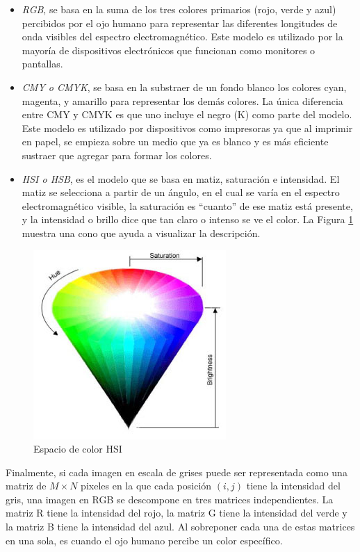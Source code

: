 \begin{itemize}

	\item \emph{RGB}, se basa en la suma de los tres colores primarios (rojo, verde y azul) percibidos por el ojo humano para representar las diferentes longitudes de onda visibles del espectro electromagnético. Este modelo es utilizado por la mayoría de dispositivos electrónicos que funcionan como monitores o pantallas.
	
	\item \emph{CMY o CMYK}, se basa en la substraer de un fondo blanco los colores cyan, magenta, y amarillo para representar los demás colores. La única diferencia entre CMY y CMYK es que uno incluye el negro (K) como parte del modelo. Este modelo es utilizado por dispositivos como impresoras ya que al imprimir en papel, se empieza sobre un medio que ya es blanco y es más eficiente sustraer que agregar para formar los colores.
	
	\item \emph{HSI o HSB}, es el modelo que se basa en matiz, saturación e intensidad. El matiz se selecciona a partir de un ángulo, en el cual se varía en el espectro electromagnético visible, la saturación es ``cuanto'' de ese matiz está presente, y la intensidad o brillo dice que tan claro o intenso se ve el color. La Figura \ref{fig:hsb} muestra una cono que ayuda a visualizar la descripción.	
	
\end{itemize}

\begin{figure}
	\includegraphics[width=0.4\linewidth]{images/hsb}
	\caption{Espacio de color HSI} \label{fig:hsb}
\end{figure}

Finalmente, si cada imagen en escala de grises puede ser representada como una matriz de $M \times N$ pixeles en la que cada posición $(i,j)$ tiene la intensidad del gris, una imagen en RGB se descompone en tres matrices independientes. La matriz R tiene la intensidad del rojo, la matriz G tiene la intensidad del verde y la matriz B tiene la intensidad del azul. Al sobreponer cada una de estas matrices en una sola, es cuando el ojo humano percibe un color específico.

